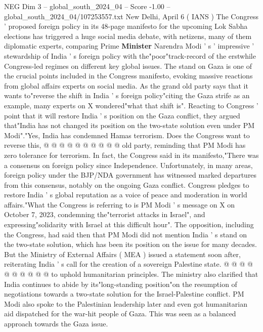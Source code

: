 \begin{textsample}{NEG Dim 3 – global\_south\_2024\_04 – Score -1.00 – global\_south\_2024\_04/107253557.txt}  \label{ex:f3_neg_249}
New Delhi, April 6 ( IANS ) The Congress ' proposed foreign policy in its 48-page manifesto for the upcoming Lok Sabha elections has triggered a huge social media debate, with netizens, many of them diplomatic experts, comparing Prime \textbf{Minister} Narendra Modi ' s ' impressive ' stewardship of India ' s foreign policy with the"poor"track-record of the erstwhile Congress-led regimes on different key global issues.
The stand on Gaza is one of the crucial points included in the Congress manifesto, evoking massive reactions from global affairs experts on social media.
As the grand old party says that it wants to"reverse the shift in India ' s foreign policy"citing the Gaza strife as an example, many experts on X wondered"what that shift is".
Reacting to Congress ' point that it will restore India ' s position on the Gaza conflict, they argued that"India has not changed its position on the two-state solution even under PM Modi"."Yes, India has condemned Hamas terrorism.
Does the Congress want to reverse this, @ @ @ @ @ @ @ @ @ @ old party, reminding that PM Modi has zero tolerance for terrorism.
In fact, the Congress said in its manifesto,"There was a consensus on foreign policy since Independence.
Unfortunately, in many areas, foreign policy under the BJP/NDA government has witnessed marked departures from this consensus, notably on the ongoing Gaza conflict.
Congress pledges to restore India ' s global reputation as a voice of peace and moderation in world affairs."What the Congress is referring to is PM Modi ' s message on X on October 7, 2023, condemning the"terrorist attacks in Israel", and expressing"solidarity with Israel at this difficult hour".
The opposition, including the Congress, had said then that PM Modi did not mention India ' s stand on the two-state solution, which has been its position on the issue for many decades.
But the Ministry of External Affairs ( MEA ) issued a statement soon after, reiterating India ' s call for the creation of a sovereign Palestine state. @ @ @ @ @ @ @ @ @ @ to uphold humanitarian principles.
The ministry also clarified that India continues to abide by its"long-standing position"on the resumption of negotiations towards a two-state solution for the Israel-Palestine conflict.
PM Modi also spoke to the Palestinian leadership later and even got humanitarian aid dispatched for the war-hit people of Gaza.
This was seen as a balanced approach towards the Gaza issue.

\end{textsample}
